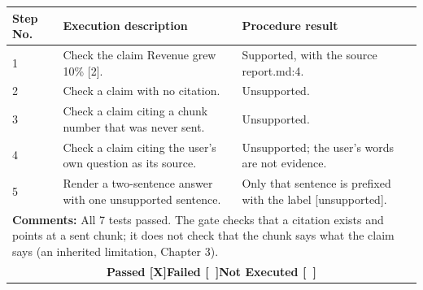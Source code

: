 \documentclass{FastFyp}
\begin{document}
{\begin{longtable}{|p{2.4cm}p{5.0cm}p{2.4cm}p{3.8cm}|}
\multicolumn{1}{|p{2.4cm}|}{\textbf{Step No.}} &
  \multicolumn{1}{p{5.0cm}|}{\textbf{Execution description}} &
  \multicolumn{2}{p{6.6cm}|}{\textbf{Procedure result}} \\ \hline
\multicolumn{1}{|p{2.4cm}|}{1} & \multicolumn{1}{p{5.0cm}|}{Check the claim Revenue grew 10\% [2].} & \multicolumn{2}{p{6.6cm}|}{Supported, with the source report.md:4.} \\ \hline
\multicolumn{1}{|p{2.4cm}|}{2} & \multicolumn{1}{p{5.0cm}|}{Check a claim with no citation.} & \multicolumn{2}{p{6.6cm}|}{Unsupported.} \\ \hline
\multicolumn{1}{|p{2.4cm}|}{3} & \multicolumn{1}{p{5.0cm}|}{Check a claim citing a chunk number that was never sent.} & \multicolumn{2}{p{6.6cm}|}{Unsupported.} \\ \hline
\multicolumn{1}{|p{2.4cm}|}{4} & \multicolumn{1}{p{5.0cm}|}{Check a claim citing the user's own question as its source.} & \multicolumn{2}{p{6.6cm}|}{Unsupported; the user's words are not evidence.} \\ \hline
\multicolumn{1}{|p{2.4cm}|}{5} & \multicolumn{1}{p{5.0cm}|}{Render a two-sentence answer with one unsupported sentence.} & \multicolumn{2}{p{6.6cm}|}{Only that sentence is prefixed with the label [unsupported].} \\ \hline
\multicolumn{4}{|p{14.8cm}|}{\textbf{Comments:} All 7 tests passed. The gate checks that a citation exists and points at a sent chunk; it does not check that the chunk says what the claim says (an inherited limitation, Chapter 3).} \\ \hline
\multicolumn{4}{|c|}{\textbf{Passed [X]\quad Failed [\ ]\quad Not Executed [\ ]}} \\ \hline
\end{longtable}
}
\end{document}
